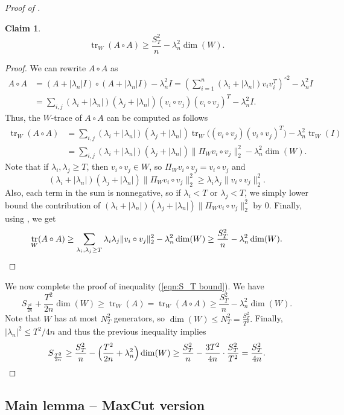 \documentclass[11pt]{article}
\theoremstyle{plain}
\newtheorem{claim}[theorem]{Claim}
\theoremstyle{definition}
\DeclareMathOperator{\trace}{tr}
\begin{document}
\begin{proof}[Proof of ]
\begin{claim}
\[\trace_W(A\circ A)\geq \frac{S_T^2}{n}-\lambda_n^2\dim(W).\]
\end{claim}
\begin{proof}
We can rewrite $A\circ A$ as
\begin{align*}
A\circ A&=(A+|\lambda_n|I)\circ (A+|\lambda_n|I)-\lambda_n^2I=\left(\sum_{i=1}^n (\lambda_i+|\lambda_n|)v_iv_i^T\right)^{\circ 2}-\lambda_n^2 I\nonumber\\
&=\sum_{i,j}(\lambda_i+|\lambda_n|)(\lambda_j+|\lambda_n|)(v_i\circ v_j)(v_i\circ v_j)^T-\lambda_n^2 I.
\end{align*}
Thus, the $W$-trace of $A\circ A$ can be computed as follows
\begin{align*}
    \trace_W(A\circ A)
    &=\sum_{i,j}(\lambda_i+|\lambda_n|)(\lambda_j+|\lambda_n|)\trace_W\big((v_i\circ v_j)(v_i\circ v_j)^T\big)-\lambda_n^2 \trace_W(I)\nonumber\\
    &=\sum_{i,j}(\lambda_i+|\lambda_n|)(\lambda_j+|\lambda_n|)\big\|\Pi_W v_i\circ v_j\big\|_2^2 - \lambda_n^2\dim(W).
\end{align*}
Note that if $\lambda_i,\lambda_j\geq T$, then $v_i\circ v_j\in W$, so $\Pi_W v_i\circ v_j=v_i\circ v_j$ and 
$$(\lambda_i+|\lambda_n|)(\lambda_j+|\lambda_n|)\big\|\Pi_W v_i\circ v_j \big\|_2^2\geq \lambda_i\lambda_j \|v_i\circ v_j\|_2^2.$$ 
Also, each term in the sum is nonnegative, so if $\lambda_i<T$ or $\lambda_j<T$, we simply lower bound the contribution of $(\lambda_i+|\lambda_n|)(\lambda_j+|\lambda_n|)\|\Pi_W v_i\circ v_j\|_2^2$ by 0. 
Finally, using , we get \[\trace_W(A\circ A)\geq \sum_{\lambda_i,\lambda_j\geq T}\lambda_i\lambda_j\|v_i\circ v_j\|_2^2-\lambda_n^2 \dim(W)\geq  \frac{S_T^2}{n}-\lambda_n^2\dim(W). \hfill\qedhere\]
\end{proof}
We now complete the proof of inequality (\ref{eqn:S_T bound}). We have 
\[S_{\frac{T^2}{2n}}+\frac{T^2}{2n}\dim(W)\geq \trace_W(A)= \trace_W(A\circ A)\geq \frac{S_T^2}{n}-\lambda_n^2\dim(W).\]
Note that $W$ has at most $N_T^2$ generators, so $\dim(W)\leq N_T^2=\frac{S_T^2}{T^2}.$ Finally, $|\lambda_n|^2\leq T^2/4n$ and thus the previous inequality implies
\[S_{\frac{T^2}{2n}}\geq \frac{S_T^2}{n}-\Big(\frac{T^2}{2n}+\lambda_n^2\Big)\dim(W)\geq \frac{S_T^2}{n} -\frac{3T^2}{4n} \cdot\frac{S_T^2}{T^2}=\frac{S_T^2}{4n}. \hfill\qedhere\]
\end{proof}

\subsection{Main lemma -- MaxCut version}
\end{document}
